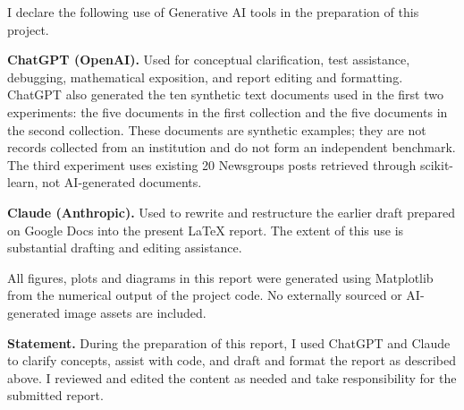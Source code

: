 \documentclass[12pt,a4paper]{report}
\theoremstyle{plain}
\theoremstyle{definition}
\theoremstyle{remark}
\theoremstyle{definition}
\begin{document}
I declare the following use of Generative AI tools in the preparation of this project.

\textbf{ChatGPT (OpenAI).} Used for conceptual clarification, test assistance, debugging, mathematical exposition, and report editing and formatting. ChatGPT also generated the ten synthetic text documents used in the first two experiments: the five documents in the first collection and the five documents in the second collection. These documents are synthetic examples; they are not records collected from an institution and do not form an independent benchmark. The third experiment uses existing 20 Newsgroups posts retrieved through scikit-learn, not AI-generated documents.

\textbf{Claude (Anthropic).} Used to rewrite and restructure the earlier draft prepared on Google Docs into the present LaTeX report. The extent of this use is substantial drafting and editing assistance.

All figures, plots and diagrams in this report were generated using Matplotlib from the numerical output of the project code. No externally sourced or AI-generated image assets are included.

\textbf{Statement.} During the preparation of this report, I used ChatGPT and Claude to clarify concepts, assist with code, and draft and format the report as described above. I reviewed and edited the content as needed and take responsibility for the submitted report.
\end{document}
